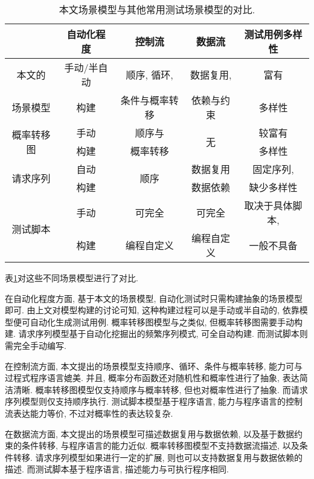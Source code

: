         \begin{table}[!htb]
            \centering
            \begin{tabular}{ccccc}
                \toprule
                 & 自动化程度 & 控制流 & 数据流 & 测试用例多样性 \\
                \midrule
                本文的 & 手动/半自动 & 顺序, 循环,  & 数据复用, & 富有 \\
                场景模型   & 构建 & 条件与概率转移 & 依赖与约束 & 多样性 \\
                \hline
                \multirow{2}{*}{概率转移图\cite{junyiw17}} & 手动 & 顺序与 & \multirow{2}{*}{无} & 较富有 \\
                & 构建 & 概率转移 &  & 多样性 \\
                \hline
                \multirow{2}{*}{请求序列\cite{taox06}\cite{xiaodongg16}} & 自动 & \multirow{2}{*}{顺序} & 数据复用 & 固定序列, \\
                & 构建 &  & 数据依赖 & 缺少多样性 \\
                \hline
                \multirow{2}{*}{测试脚本} & 手动 & 可完全 & 可完全 & 取决于具体脚本, \\
                & 构建 & 编程自定义 & 编程自定义 & 一般不具备 \\
                \bottomrule
            \end{tabular}
            \caption{本文场景模型与其他常用测试场景模型的对比.}
            \label{tab:related_work_compare}
        \end{table}
        
        表\ref{tab:related_work_compare}对这些不同场景模型进行了对比. 
        
        在自动化程度方面, 基于本文的场景模型, 自动化测试时只需构建抽象的场景模型即可. 由上文对模型构建的讨论可知, 这种构建过程可以是手动或半自动的, 依靠模型便可自动化生成测试用例. 概率转移图模型与之类似, 但概率转移图需要手动构建. 请求序列模型基于自动化挖掘出的频繁序列模式, 可全自动构建. 而测试脚本则需完全手动编写.
            
        在控制流方面, 本文提出的场景模型支持顺序、循环、条件与概率转移, 能力可与过程式程序语言媲美. 并且, 概率分布函数还对随机性和概率性进行了抽象, 表达简洁清晰. 概率转移图模型仅支持顺序与概率转移, 但也对概率性进行了抽象. 而请求序列模型则仅支持顺序执行. 测试脚本模型基于程序语言, 能力与程序语言的控制流表达能力等价, 不过对概率性的表达较复杂.
            
        在数据流方面, 本文提出的场景模型可描述数据复用与数据依赖, 以及基于数据约束的条件转移, 与程序语言的能力近似. 概率转移图模型不支持数据流描述, 以及条件转移. 请求序列模型如果进行一定的扩展, 则也可以支持数据复用与数据依赖的描述. 而测试脚本基于程序语言, 描述能力与可执行程序相同.
            
